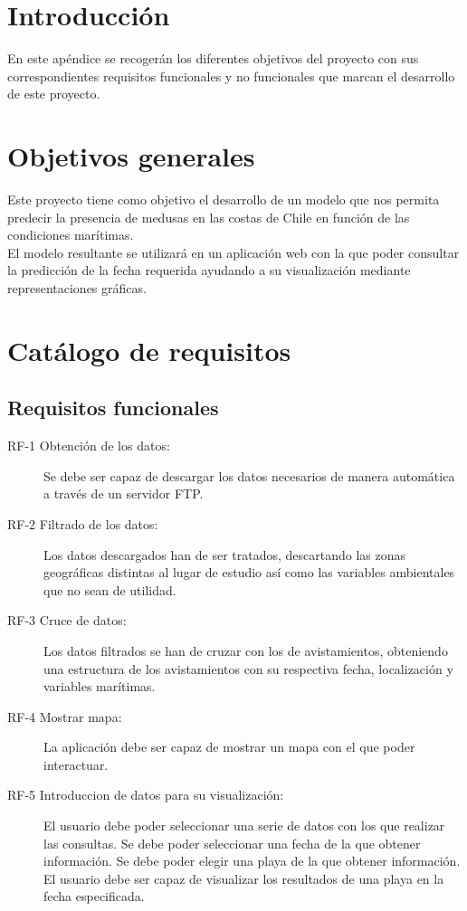 
\section{Introducción}
En este apéndice se recogerán los diferentes objetivos del proyecto con sus correspondientes requisitos funcionales y no funcionales que marcan el desarrollo de este proyecto.

\section{Objetivos generales}

Este proyecto tiene como objetivo el desarrollo de un modelo que nos permita predecir la presencia de medusas en las costas de Chile en función de las condiciones marítimas.\\
El modelo resultante se utilizará en un aplicación web con la que poder consultar la predicción de la fecha requerida ayudando a su visualización mediante representaciones gráficas.

\section{Catálogo de requisitos}

	\subsection{Requisitos funcionales}

\begin{description}
	\item[RF-1 Obtención de los datos:] Se debe ser capaz de descargar los datos necesarios de manera automática a través de un servidor FTP.
	\item[RF-2 Filtrado de los datos:] Los datos descargados han de ser tratados, descartando las zonas geográficas distintas al lugar de estudio así como las variables ambientales que no sean de utilidad.
	\item[RF-3 Cruce de datos:] Los datos filtrados se han de cruzar con los de avistamientos, obteniendo una estructura de los avistamientos con su respectiva fecha, localización y variables marítimas.	
	\item[RF-4 Mostrar mapa:] La aplicación debe ser capaz de mostrar un mapa con el que poder interactuar.
	\item[RF-5 Introduccion de datos para su visualización:] El usuario debe poder seleccionar una serie de datos con los que realizar las consultas.
	 Se debe poder seleccionar una fecha de la que obtener información.
	 Se debe poder elegir una playa de la que obtener información.
	 El usuario debe ser capaz de visualizar los resultados de una playa en la fecha especificada.	
\end{description}

